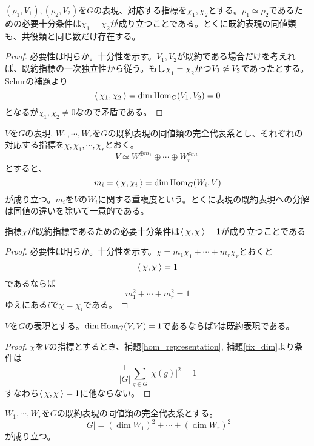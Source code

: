 \documentclass{ltjsreport}
\begin{document}
\begin{cor}\label{rep_and_char}
  $(\rho_1,V_1),(\rho_2,V_2)$を$G$の表現、対応する指標を$\chi_1,\chi_2$とする。$\rho_1\simeq \rho_2$であるための必要十分条件は$\chi_1=\chi_2$が成り立つことである。とくに既約表現の同値類も、共役類と同じ数だけ存在する。
\end{cor}

\begin{proof}
  必要性は明らか。十分性を示す。$V_1,V_2$が既約である場合だけを考えれば、既約指標の一次独立性から従う。もし$\chi_1=\chi_2$かつ$V_1\not\simeq V_2$であったとする。Schurの補題より
  \[
  \langle\:\chi_1,\chi_2\:\rangle=\dim\text{Hom}_G(V_1,V_2)=0  
  \]
  となるが$\chi_1,\chi_2\neq 0$なので矛盾である。
\end{proof}


\begin{cor}\label{multiplicity}
  $V$を$G$の表現, $W_1,\cdots,W_r$を$G$の既約表現の同値類の完全代表系とし、それぞれの対応する指標を$\chi,\chi_1,\cdots,\chi_r$とおく。
  \[
  V\simeq W_1^{\oplus m_1}\oplus\cdots\oplus W_r^{\oplus m_r}  
  \]
  とすると、
  \[
  m_i=\langle\:\chi,\chi_i\:\rangle=\dim\text{Hom}_G(W_i,V)
  \]
  が成り立つ。$m_i$を$V$の$W_i$に関する重複度という。とくに表現の既約表現への分解は同値の違いを除いて一意的である。
\end{cor}

\begin{cor}
  指標$\chi$が既約指標であるための必要十分条件は$\langle\:\chi,\chi\:\rangle=1$が成り立つことである
\end{cor}

\begin{proof}
  必要性は明らか。十分性を示す。$\chi=m_1\chi_1+\cdots+m_r\chi_r$とおくと
  \[
  \langle\:\chi,\chi\:\rangle=1  
  \]
  であるならば
  \[
  m_1^2+\cdots+m_r^2=1  
  \]
  ゆえにある$i$で$\chi=\chi_i$である。
\end{proof}

\begin{cor}[Schurの補題の逆]\label{reverse_schur}
  $V$を$G$の表現とする。$\dim\text{Hom}_G(V,V)=1$であるならば$V$は既約表現である。
\end{cor}

\begin{proof}
  $\chi$を$V$の指標とするとき、補題\ref{hom_representation}, 補題\ref{fix_dim}より条件は
  \[
  \frac{1}{|G|}\sum_{g\in G}|\chi(g)|^2=1
  \]
  すなわち$\langle\:\chi,\chi\:\rangle=1$に他ならない。
\end{proof}


\begin{prop}\label{dim_formula}
  $W_1,\cdots,W_r$を$G$の既約表現の同値類の完全代表系とする。
  \[
  |G|=(\dim W_1)^2+\cdots +(\dim W_r)^2  
  \]
  が成り立つ。
\end{prop}
\end{document}
